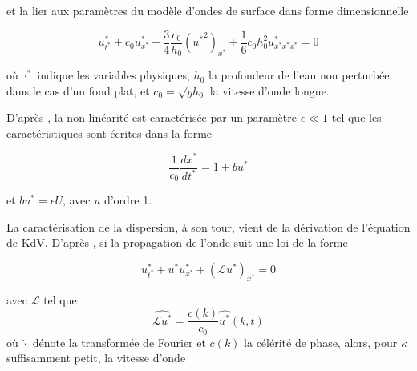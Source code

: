 \noindent et la lier aux paramètres du modèle d'ondes de surface dans forme dimensionnelle \cite{Khorsand2014}

\begin{equation}
\label{eq:physiqueKdV}
    u^*_{t^*} + c_0u^*_{x^*} + \frac{3}{4}\frac{c_0}{h_0}({u^*}^2)_{x^*} + \frac{1}{6}c_0h_0^2u^*_{x^*x^*x^*} = 0 
\end{equation}

\noindent où $\cdot^*$ indique les variables physiques, $h_0$ la profondeur de l'eau non perturbée dans le cas d'un fond plat, et $c_0 = \sqrt{gh_0}$ la vitesse d'onde longue.

%
%
%
%
%
%
%
%


\indent D'après \cite{BBM1971}, la non linéarité est caractérisée par un paramètre $\epsilon \ll 1$ tel que les caractéristiques sont écrites dans la forme

$$ \frac{1}{c_0} \frac{dx^*}{dt^*} = 1+ bu^*$$

\noindent et $bu^*=\epsilon U$, avec $u$ d'ordre 1. 


\indent La caractérisation de la dispersion, à son tour, vient de la dérivation de l'équation de KdV. D'après \cite{BBM1971}, si la propagation de l'onde suit une loi de la forme

$$ u^*_{t^*} + u^*u^*_{x^*}+(\mathcal{L} u^*)_{x^*} = 0$$

\noindent avec $\mathcal{L}$ tel que $$ \widehat{\mathcal{L}u^*} = \frac{c(k)}{c_0} \widehat{u^*}(k,t)$$ où $\hat \cdot$ dénote la transformée de Fourier et  $c(k)$ la célérité  de phase, alors, pour $\kappa$ suffisamment petit, la vitesse d'onde

